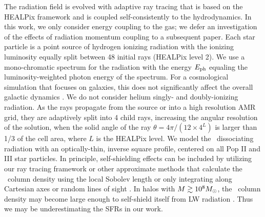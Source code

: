 \documentclass[apjl]{emulateapj}
\begin{document}
The radiation field is evolved with adaptive ray tracing
\citep{Abel02_RT, Wise11_Moray} that is based on the HEALPix framework
\citep{HEALPix} and is coupled self-consistently to the hydrodynamics.
In this work, we only consider energy coupling to the gas; we defer an
investigation of the effects of radiation momentum coupling to a
subsequent paper.  Each star particle is a point source of hydrogen
ionizing radiation with the ionizing luminosity equally split between
48 initial rays (HEALPix level 2).  We use a mono-chromatic spectrum
for the radiation with the energy $E_{\rm ph}$ equaling the
luminosity-weighted photon energy of the spectrum.  For a cosmological
simulation that focuses on galaxies, this does not significantly
affect the overall galactic dynamics \citep[see Sec. 6.3
  in][]{Wise11_Moray}.  We do not consider helium singly- and
doubly-ionizing radiation.  As the rays propagate from the source or
into a high resolution AMR grid, they are adaptively split into 4
child rays, increasing the angular resolution of the solution, when
the solid angle of the ray $\theta = 4\pi/(12 \times 4^{L})$ is larger
than 1/3 of the cell area, where $L$ is the HEALPix level.  We model
the \hh~dissociating radiation with an optically-thin, inverse square
profile, centered on all Pop II and III star particles.  In principle,
self-shielding effects can be included by utilizing our ray tracing
framework or other approximate methods that calculate the \hh~column
density using the local Sobolev length \citep{Wolcott11} or only
integrating along Cartesian axes or random lines of sight
\citep{Yoshida03, Yoshida07_HII, Glover07}.  In halos with $M \ga 10^8
\Ms$, the \hh~column density may become large enough to self-shield
itself from LW radiation \citep{Wise08_Gal}.  Thus we may be
underestimating the SFRs in our work.
\end{document}
